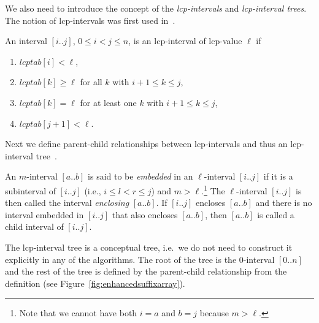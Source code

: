 We also need to introduce the concept of the \emph{lcp-intervals} and \emph{lcp-interval trees}. The notion of lcp-intervals was first used in~\cite{enhancedsuffixarrays}.
\begin{definition}
An interval $[i..j]$, $0 \leq i < j \leq n$, is an lcp-interval of lcp-value $\ell$ if

\begin{enumerate}
\item $lcptab[i] < \ell$,
\item $lcptab[k] \geq \ell$ for all $k$ with $i + 1 \leq k \leq j$,
\item $lcptab[k] = \ell$ for at least one $k$ with $i + 1 \leq k \leq j$,
\item $lcptab[j + 1] < \ell$.
\end{enumerate}
\end{definition}

Next we define parent-child relationships between lcp-intervals and thus an lcp-interval tree~\cite{enhancedsuffixarrays}.

\begin{definition}
  An $m$-interval $[a..b]$ is said to be \emph{embedded} in an $\ell$-interval $[i..j]$ if it is a subinterval of $[i..j]$ (i.e., $i \leq l < r \leq j $) and $m > \ell$.\footnote{Note that we cannot have both $i = a$ and $b = j$ because $m > \ell$.}
  The $\ell$-interval $[i..j ]$ is then called the interval \emph{enclosing} $[a..b]$. If $[i..j]$ encloses $[a..b]$ and there is no interval embedded in $[i..j]$ that also encloses $[a..b]$, then $[a..b]$ is called a child interval of $[i..j]$.
\end{definition}

The lcp-interval tree is a conceptual tree, i.e.\ we do not need to construct it explicitly in any of the algorithms. The root of the tree is the $0$-interval $[0..n]$ and the rest of the tree is defined by the parent-child relationship from the definition (see Figure~\ref{fig:enhancedsuffixarray}).

